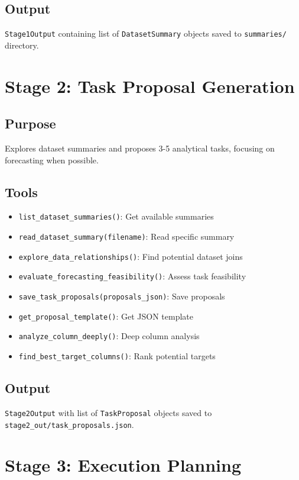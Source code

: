 \documentclass[12pt,a4paper]{report}
\begin{document}
\subsection{Output}
\texttt{Stage1Output} containing list of \texttt{DatasetSummary} objects saved to \texttt{summaries/} directory.

\section{Stage 2: Task Proposal Generation}
\subsection{Purpose}
Explores dataset summaries and proposes 3-5 analytical tasks, focusing on forecasting when possible.

\subsection{Tools}
\begin{itemize}
    \item \texttt{list\_dataset\_summaries()}: Get available summaries
    \item \texttt{read\_dataset\_summary(filename)}: Read specific summary
    \item \texttt{explore\_data\_relationships()}: Find potential dataset joins
    \item \texttt{evaluate\_forecasting\_feasibility()}: Assess task feasibility
    \item \texttt{save\_task\_proposals(proposals\_json)}: Save proposals
    \item \texttt{get\_proposal\_template()}: Get JSON template
    \item \texttt{analyze\_column\_deeply()}: Deep column analysis
    \item \texttt{find\_best\_target\_columns()}: Rank potential targets
\end{itemize}

\subsection{Output}
\texttt{Stage2Output} with list of \texttt{TaskProposal} objects saved to \texttt{stage2\_out/task\_proposals.json}.

\section{Stage 3: Execution Planning}
\end{document}

